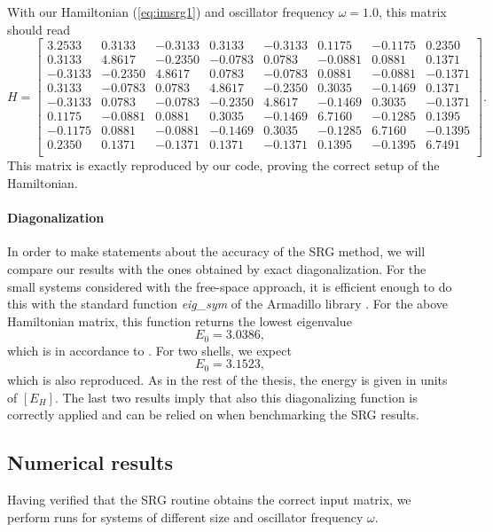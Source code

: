 With our Hamiltonian (\ref{eq:imsrg1}) and oscillator frequency $\omega = 1.0$, this matrix should read \cite{Marte}
{\small
\[
H = \left[
\begin{array}{cccccccc}
3.2533  & 0.3133 & -0.3133 &  0.3133 & -0.3133  & 0.1175 & -0.1175 &  0.2350\\
  0.3133  & 4.8617 & -0.2350&  -0.0783 &  0.0783  &-0.0881&   0.0881&  0.1371\\
  -0.3133 & -0.2350 &  4.8617&  0.0783 & -0.0783  & 0.0881 & -0.0881 & -0.1371\\
   0.3133  &-0.0783&   0.0783  & 4.8617&  -0.2350 &  0.3035 & -0.1469 &  0.1371\\
  -0.3133  & 0.0783 & -0.0783 & -0.2350 &  4.8617 & -0.1469 &  0.3035 & -0.1371\\
   0.1175  &-0.0881 &  0.0881 &  0.3035  &-0.1469  & 6.7160 & -0.1285  & 0.1395\\
  -0.1175  & 0.0881 & -0.0881 & -0.1469   &0.3035 & -0.1285  & 6.7160 & -0.1395\\
   0.2350 &  0.1371 & -0.1371 &  0.1371  &-0.1371&   0.1395  &-0.1395&   6.7491\\
\end{array}
\right].
\]
}
This matrix is exactly reproduced by our code, proving the correct setup of the Hamiltonian. 

\paragraph*{Diagonalization}
In order to make statements about the accuracy of the SRG method, we will compare our results  with the ones obtained by exact diagonalization. For the small systems considered with the free-space approach, it is efficient enough to do this with the standard function \textit{eig\_sym} of the Armadillo library \cite{Armadillo}. For the above Hamiltonian matrix, this function returns the lowest eigenvalue\\
\[
E_0 = 3.0386,
\]
which is in accordance to \cite{Marte}. For two shells, we expect \cite{Christoffer}
\[
E_0 = 3.1523,
\]
which is also reproduced. As in the rest of the thesis, the energy is given in units of $\left[ E_H \right]$. The last two results imply that also this diagonalizing function is correctly applied and can be relied on when benchmarking the SRG results.

\subsection{Numerical results}
Having verified that the SRG routine obtains the correct input matrix, we perform runs for systems of different size and oscillator frequency $\omega$.

